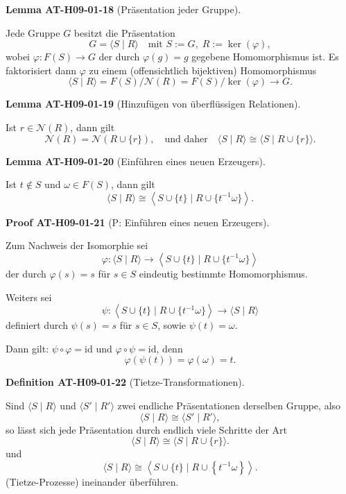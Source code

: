 \documentclass[10pt, letterpaper]{article}
\newcommand{\CustomHeading}[3]{%
  \par\medskip\noindent%
  \textbf{#1 #2} \textnormal{(#3)}.\enskip%
}
\newenvironment{DEF}[2]{\CustomHeading{Definition}{#1}{#2}}{}
\newenvironment{LEM}[2]{\CustomHeading{Lemma}{#1}{#2}}{}
\newenvironment{PROOF}[2]{\CustomHeading{Proof}{#1}{#2}}{}
\begin{document}
\begin{LEM}{AT-H09-01-18}{Präsentation jeder Gruppe}
Jede Gruppe $G$ besitzt die Präsentation
\[
G=\langle S \mid R\rangle \quad\text{mit } S := G,\; R := \ker(\varphi),
\]
wobei $\varphi: F(S) \rightarrow G$ der durch $\varphi(g)=g$ gegebene Homomorphismus ist.
Es faktorisiert dann $\varphi$ zu einem (offensichtlich bijektiven) Homomorphismus
\[
\langle S \mid R\rangle = F(S)/\mathcal{N}(R) = F(S)/\ker(\varphi) \longrightarrow G.
\]
\end{LEM}

\begin{LEM}{AT-H09-01-19}{Hinzufügen von überflüssigen Relationen}
Ist $r \in \mathcal{N}(R)$, dann gilt
\[
\mathcal{N}(R) = \mathcal{N}(R \cup \{r\}),
\quad\text{und daher}\quad
\langle S \mid R \rangle \cong \langle S \mid R \cup \{r\} \rangle.
\]
\end{LEM}

\begin{LEM}{AT-H09-01-20}{Einführen eines neuen Erzeugers}
Ist $t \notin S$ und $\omega \in F(S)$, dann gilt
\[
\langle S \mid R\rangle \cong \left\langle S \cup \{t\} \mid R \cup \{t^{-1} \omega\} \right\rangle.
\]
\end{LEM}

\begin{PROOF}{AT-H09-01-21}{P: Einführen eines neuen Erzeugers}
Zum Nachweis der Isomorphie sei
\[
\varphi: \langle S \mid R\rangle \to \left\langle S \cup \{t\} \mid R \cup \{t^{-1}\omega\} \right\rangle
\]
der durch $\varphi(s) = s$ für $s \in S$ eindeutig bestimmte Homomorphismus.

Weiters sei
\[
\psi: \left\langle S \cup \{t\} \mid R \cup \{t^{-1}\omega\} \right\rangle \to \langle S \mid R\rangle
\]
definiert durch $\psi(s) = s$ für $s \in S$, sowie $\psi(t) = \omega$.

Dann gilt: $\psi \circ \varphi = \mathrm{id}$ und $\varphi \circ \psi = \mathrm{id}$, denn
\[
\varphi(\psi(t)) = \varphi(\omega) = t.
\]
\end{PROOF}

\begin{DEF}{AT-H09-01-22}{Tietze-Transformationen}
Sind $\langle S \mid R\rangle$ und $\langle S' \mid R'\rangle$ zwei endliche Präsentationen derselben Gruppe, also
\[
\langle S \mid R\rangle \cong \langle S' \mid R'\rangle,
\]
so lässt sich jede Präsentation durch endlich viele Schritte der Art
$$
\langle S \mid R\rangle \cong\langle S \mid R \cup\{r\}\rangle .
$$
und
$$
\langle S \mid R\rangle \cong\left\langle S \cup\{t\} \mid R \cup\left\{t^{-1} \omega\right\}\right\rangle .
$$
(Tietze-Prozesse) ineinander überführen.
\end{DEF}
\end{document}
